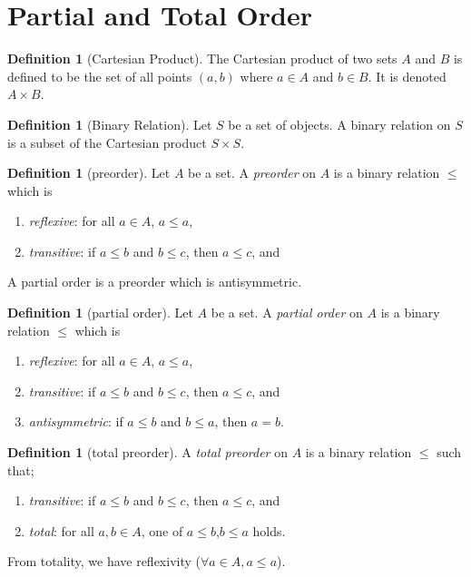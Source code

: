 \documentclass{article}
\theoremstyle{definition}
\newtheorem{definition}[theorem]{Definition}
\begin{document}
\section{Partial and Total Order}

\begin{definition} [Cartesian Product]
The Cartesian product of two sets $A$ and $B$ 
is defined to be the set of all points $(a,b)$
where $a \in A$ and $b \in B$. 
It is denoted $A \times B$.
\end{definition}

\begin{definition} [Binary Relation]
Let $S$ be a set of objects.
A binary relation on $S$ is a subset of the Cartesian product $S \times S$.
\end{definition}

\begin{definition}[preorder]
Let $A$ be a set. A {\em preorder} on $A$ is a binary relation $\leq$ which is
\begin{enumerate}
\item {\em reflexive}: for all $a \in A$,  $a \leq a$,
\item {\em transitive}:  if $a \leq b$ and $b \leq c$, then $a \leq c$, and
\end{enumerate}
\end{definition}

A partial order is a preorder which is antisymmetric.

\begin{definition}[partial order]
Let $A$ be a set. A {\em partial order} on $A$ is a binary relation $\leq$ which is
\begin{enumerate}
\item {\em reflexive}: for all $a \in A$,  $a \leq a$,
\item {\em transitive}:  if $a \leq b$ and $b \leq c$, then $a \leq c$, and
\item {\em antisymmetric}: if $a \leq b$ and $b \leq a$, then $a = b$.
\end{enumerate}
\end{definition}

\begin{definition}[total preorder]
A {\em total preorder} on $A$ is a binary relation $\leq$ such that; 
\begin{enumerate}
\item {\em transitive}:  if $a \leq b$ and $b \leq c$, then $a \leq c$, and
\item {\em total}: for all $a,b \in A$, 
one of $a \leq b$,$b \leq a$ holds. 
\end{enumerate}
From totality, we have reflexivity ($ \forall a \in A, a \leq a$). 
\end{definition}
\end{document}
